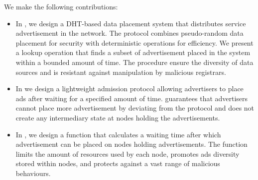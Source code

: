  We make the following contributions:
\begin{itemize}
    \item In , we design a DHT-based data placement system that distributes service advertisement in the network. The protocol combines pseudo-random data placement for security with deterministic operations for efficiency. We present a lookup operation that finds a subset of advertisement placed in the system within a bounded amount of time. The procedure ensure the diversity of data sources and is resistant against manipulation by malicious registrars. 
    \item In  we design a lightweight admission protocol allowing advertisers to place ads after waiting for a specified amount of time.  \sysname guarantees that advertisers cannot place more advertisement by deviating from the protocol  and does not create any intermediary state at nodes holding the advertisements.
    \item In , we design a function that calculates a waiting time after which advertisement can be placed on nodes holding advertisements. The function limits the amount of resources used by each node, promotes ads diversity stored within nodes, and protects against a vast range of malicious behaviours. 
\end{itemize}




